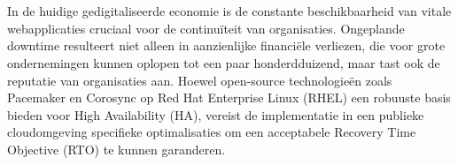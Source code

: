 
%
%
%
%
%

%



\chapter*{}

In de huidige gedigitaliseerde economie is de constante beschikbaarheid van vitale webapplicaties cruciaal voor de continuïteit van organisaties. Ongeplande downtime resulteert niet alleen in aanzienlijke financiële verliezen, die voor grote ondernemingen kunnen oplopen tot een paar honderdduizend, maar tast ook de reputatie van organisaties aan. Hoewel open-source technologieën zoals Pacemaker en Corosync op Red Hat Enterprise Linux (RHEL) een robuuste basis bieden voor High Availability (HA), vereist de implementatie in een publieke cloudomgeving specifieke optimalisaties om een acceptabele Recovery Time Objective (RTO) te kunnen garanderen.
\medskip

